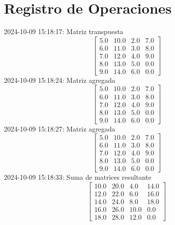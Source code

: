 \documentclass{article}%
\begin{document}
%
\normalsize%
\section{Registro de Operaciones}%
\label{sec:RegistrodeOperaciones}%
2024{-}10{-}09 15:18:17: Matriz transpuesta\newline%
%
\[%
\begin{bmatrix} 5.0 & 10.0 & 2.0 & 7.0 \\ 6.0 & 11.0 & 3.0 & 8.0 \\ 7.0 & 12.0 & 4.0 & 9.0 \\ 8.0 & 13.0 & 5.0 & 0.0 \\ 9.0 & 14.0 & 6.0 & 0.0 \end{bmatrix}%
\]%
2024{-}10{-}09 15:18:24: Matriz agregada\newline%
%
\[%
\begin{bmatrix} 5.0 & 10.0 & 2.0 & 7.0 \\ 6.0 & 11.0 & 3.0 & 8.0 \\ 7.0 & 12.0 & 4.0 & 9.0 \\ 8.0 & 13.0 & 5.0 & 0.0 \\ 9.0 & 14.0 & 6.0 & 0.0 \end{bmatrix}%
\]%
2024{-}10{-}09 15:18:27: Matriz agregada\newline%
%
\[%
\begin{bmatrix} 5.0 & 10.0 & 2.0 & 7.0 \\ 6.0 & 11.0 & 3.0 & 8.0 \\ 7.0 & 12.0 & 4.0 & 9.0 \\ 8.0 & 13.0 & 5.0 & 0.0 \\ 9.0 & 14.0 & 6.0 & 0.0 \end{bmatrix}%
\]%
2024{-}10{-}09 15:18:33: Suma de matrices resultante\newline%
%
\[%
\begin{bmatrix} 10.0 & 20.0 & 4.0 & 14.0 \\ 12.0 & 22.0 & 6.0 & 16.0 \\ 14.0 & 24.0 & 8.0 & 18.0 \\ 16.0 & 26.0 & 10.0 & 0.0 \\ 18.0 & 28.0 & 12.0 & 0.0 \end{bmatrix}%
\]

%
\end{document}
